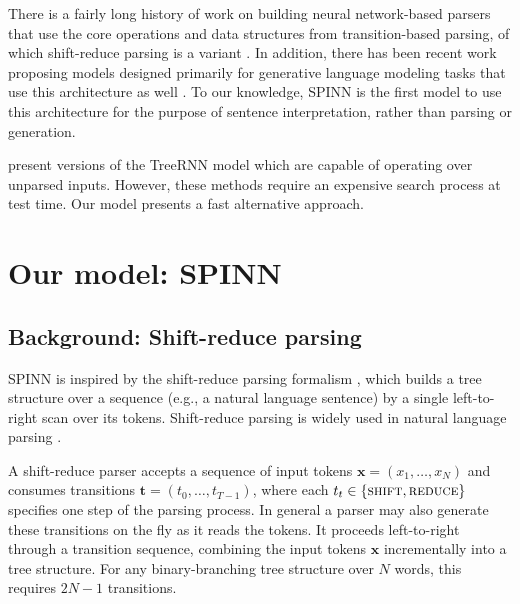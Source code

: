 \documentclass[11pt]{article}
\newcommand{\shift}{\textsc{shift}}
\newcommand{\reduce}{\textsc{reduce}}
\begin{document}
There is a fairly long history of work on building neural network-based parsers that use the core operations and data structures from transition-based parsing, of which shift-reduce parsing is a variant \citep{henderson2004discriminative,emami2005neural,titov2010latent,chen2014,buys2generative,dyer-EtAl:2015:ACL-IJCNLP,kiperwasser2016easy}. In addition, there has been recent work proposing models designed primarily for generative language modeling tasks that use this architecture as well \citep{zhang2016top,dyer2016rnn}. To our knowledge, SPINN is the first model to use this architecture for the purpose of sentence interpretation, rather than parsing or generation.  %

\citet{socher2011parsing,socher2011semi} present versions of the TreeRNN model which are capable of operating over unparsed inputs. However, these methods require an expensive search process at test time. Our model presents a fast alternative approach.

\section{Our model: SPINN}

\subsection{Background: Shift-reduce parsing}

SPINN is inspired by the shift-reduce parsing formalism \citep{aho1972theory}, which builds a tree structure over a sequence (e.g., a natural language sentence) by a single left-to-right scan over its tokens. Shift-reduce parsing is widely used in natural language parsing \citep[e.g.,][]{shieber:1983:ACL,nivre2003efficient}.

A shift-reduce parser accepts a sequence of input tokens $\mathbf x = (x_1, \dots, x_N)$ and consumes transitions $\mathbf t = (t_0, \dots, t_{T-1})$, where each $t_t \in \{\shift, \reduce\}$ specifies one step of the parsing process. In general a parser may also generate these transitions on the fly as it reads the tokens. It proceeds left-to-right through a transition sequence, combining the input tokens $\mathbf x$ incrementally into a tree structure. For any binary-branching tree structure over $N$ words, this requires $2N - 1$ transitions.
\end{document}
